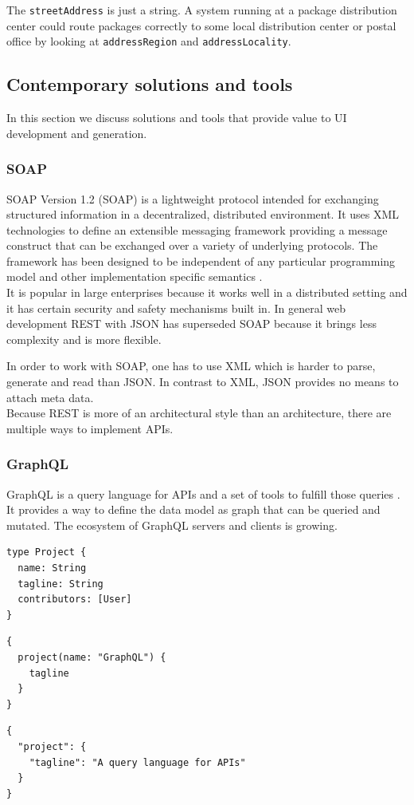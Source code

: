 The \lstinline{streetAddress} is just a string. A system running at a package distribution center could route packages correctly to some local distribution center or postal office by looking at \lstinline{addressRegion} and \lstinline{addressLocality}.

\subsection{Contemporary solutions and tools}\label{sec:contemporarysolutions}
In this section we discuss solutions and tools that provide value to UI development and generation.

\subsubsection{SOAP}\label{sec:soap}
SOAP Version 1.2 (SOAP) is a lightweight protocol intended for exchanging structured information in a decentralized, distributed environment. It uses XML technologies to define an extensible messaging framework providing a message construct that can be exchanged over a variety of underlying protocols. The framework has been designed to be independent of any particular programming model and other implementation specific semantics \citep{soap}. \\
It is popular in large enterprises because it works well in a distributed setting and it has certain security and safety mechanisms built in. In general web development REST with JSON has superseded SOAP because it brings less complexity and is more flexible.

In order to work with SOAP, one has to use XML  which is harder to parse, generate and read than JSON. In contrast to XML, JSON provides no means to attach meta data. \\
Because REST is more of an architectural style than an architecture, there are multiple ways to implement APIs.

\subsubsection{GraphQL}\label{graphql}
GraphQL is a query language for APIs and a set of tools to fulfill those queries \citep{graphql}. It provides a way to define the data model as graph that can be queried and mutated. The ecosystem of GraphQL servers and clients is growing.

\lstset{language=GraphQL}
\begin{lstlisting}[caption=Simple data model in the GraphQL data description language.]
type Project {
  name: String
  tagline: String
  contributors: [User]
}
\end{lstlisting}
\lstset{language=GraphQL}
\begin{lstlisting}[caption=Example of a GraphQL query to fetch the tagline of a certain project.]
{
  project(name: "GraphQL") {
    tagline
  }
}
\end{lstlisting}
\lstset{language=JSON}
\begin{lstlisting}[caption=Response of the GraphQL server in JSON.]
{
  "project": {
    "tagline": "A query language for APIs"
  }
}\end{lstlisting}

